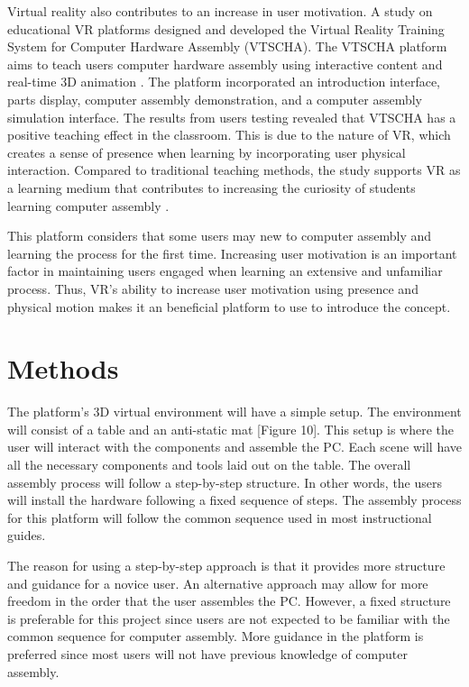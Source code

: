 \documentclass[10pt,twocolumn]{article}
\begin{document}
\par Virtual reality also contributes to an increase in user motivation. A study on educational VR platforms designed and developed the Virtual Reality Training System for Computer Hardware Assembly (VTSCHA). The VTSCHA platform aims to teach users computer hardware assembly using interactive content and real-time 3D animation \cite{Tong2020DesignAndApplication}. The platform incorporated an introduction interface, parts display, computer assembly demonstration, and a computer assembly simulation interface. The results from users testing revealed that VTSCHA has a positive teaching effect in the classroom. This is due to the nature of VR, which creates a sense of presence when learning by incorporating user physical interaction. Compared to traditional teaching methods, the study supports VR as a learning medium that contributes to increasing the curiosity of students learning computer assembly \cite{Chen2011AVirtualRealityExperiment}.

\par This platform considers that some users may new to computer assembly and learning the process for the first time. Increasing user motivation is an important factor in maintaining users engaged when learning an extensive and unfamiliar process. Thus, VR’s ability to increase user motivation using presence and physical motion makes it an beneficial platform to use to introduce the concept. 

\section{Methods}

\par The platform’s 3D virtual environment will have a simple setup. The environment will consist of a table and an anti-static mat [Figure 10]. This setup is where the user will interact with the components and assemble the PC. Each scene will have all the necessary components and tools laid out on the table. The overall assembly process will follow a step-by-step structure. In other words, the users will install the hardware following a fixed sequence of steps. The assembly process for this platform will follow the common sequence used in most instructional guides. 

\par The reason for using a step-by-step approach is that it provides more structure and guidance for a novice user. An alternative approach may allow for more freedom in the order that the user assembles the PC. However, a fixed structure is preferable for this project since users are not expected to be familiar with the common sequence for computer assembly. More guidance in the platform is preferred since most users will not have previous knowledge of computer assembly.
\end{document}
